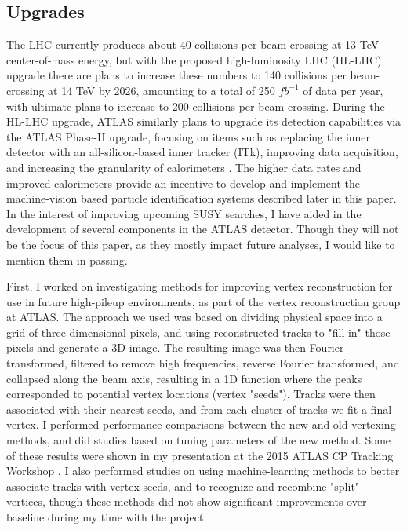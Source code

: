 \subsection*{Upgrades}

The LHC currently produces about 40 collisions per beam-crossing at 13 TeV center-of-mass energy, but with the proposed high-luminosity LHC (HL-LHC) upgrade there are plans to increase these numbers to 140 collisions per beam-crossing at 14 TeV by 2026, amounting to a total of 250 $fb^{-1}$ of data per year, with ultimate plans to increase to 200 collisions per beam-crossing. During the HL-LHC upgrade, ATLAS similarly plans to upgrade its detection capabilities via the ATLAS Phase-II upgrade, focusing on items such as replacing the inner detector with an all-silicon-based inner tracker (ITk), improving data acquisition, and increasing the granularity of calorimeters \cite{ATLAS_phaseII}. The higher data rates and improved calorimeters provide an incentive to develop and implement the machine-vision based particle identification systems described later in this paper. In the interest of improving upcoming SUSY searches, I have aided in the development of several components in the ATLAS detector. Though they will not be the focus of this paper, as they mostly impact future analyses, I would like to mention them in passing.

First, I worked on investigating methods for improving vertex reconstruction for use in future high-pileup environments, as part of the vertex reconstruction group at ATLAS. The approach we used was based on dividing physical space into a grid of three-dimensional pixels, and using reconstructed tracks to "fill in" those pixels and generate a 3D image. The resulting image was then Fourier transformed, filtered to remove high frequencies, reverse Fourier transformed, and collapsed along the beam axis, resulting in a 1D function where the peaks corresponded to potential vertex locations (vertex "seeds"). Tracks were then associated with their nearest seeds, and from each cluster of tracks we fit a final vertex. I performed performance comparisons between the new and old vertexing methods, and did studies based on tuning parameters of the new method. Some of these results were shown in my presentation at the 2015 ATLAS CP Tracking Workshop \cite{vertex}. I also performed studies on using machine-learning methods to better associate tracks with vertex seeds, and to recognize and recombine "split" vertices, though these methods did not show significant improvements over baseline during my time with the project.

